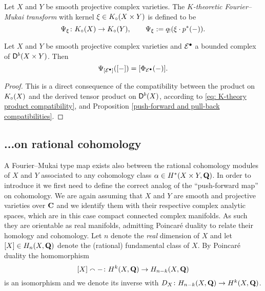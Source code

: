 
\begin{definition}
    Let $X$ and $Y$ be smooth projective complex varieties. The \emph{$K$-theoretic Fourier--Mukai transform} with kernel $\xi \in K_{\circ}(X \times Y)$ is defined to be
    \[
        \Psi_{\xi} \colon K_{\circ}(X) \to K_{\circ}(Y), \qquad \Psi_{\xi} := q_!(\xi \cdot p^*(-)).
    \]
\end{definition}

\begin{corollary}
    Let $X$ and $Y$ be smooth projective complex varieties and $\mathcal E^\bullet$ a bounded complex of $\mathsf{D}^b(X \times Y)$. Then
    \[
        \Psi_{[\mathcal E^\bullet]}([-]) = [\Phi_{\mathcal E^\bullet}(-)].
    \]
\end{corollary}

\begin{proof}
    This is a direct consequence of the compatibility between the product on $K_{\circ}(X)$ and the derived tensor product on $\mathsf{D}^b(X)$, according to \eqref{eq: K-theory product compatibility}, and Proposition \ref{push-forward and pull-back compatibilities}.
\end{proof}

\subsection{...on rational cohomology}
\label{Subsection: FM transform on cohomology}

A Fourier--Mukai type map exists also between the rational cohomology modules of $X$ and $Y$ associated to any cohomology class $\alpha \in H^{*}(X \times Y, \mathbf Q)$. In order to introduce it we first need to define the correct analog of the ``push-forward map'' on cohomology. We are again assuming that $X$ and $Y$ are smooth and projective varieties over $\mathbf C$ and we identify them with their respective complex analytic spaces, which are in this case compact connected complex manifolds. As such they are orientable as real manifolds, admitting Poincaré duality to relate their homology and cohomology. Let $n$ denote the \emph{real} dimension of $X$ and let $[X] \in H_n(X, \mathbf Q)$ denote the (rational) fundamental class of $X$. By Poincaré duality \cite[\S VI, Theorem 8.3]{Bredon1993} the homomorphism
\[
    [X] \smallfrown - \colon H^{k}(X, \mathbf Q) \to H_{n-k}(X, \mathbf Q)
\]
is an isomorphism and we denote its inverse with $D_X \colon H_{n-k}(X, \mathbf Q) \to H^{k}(X, \mathbf Q)$.

